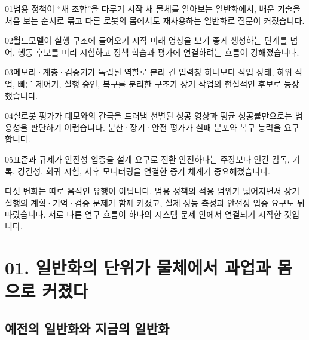 \documentclass[11pt,openany]{book}
\begin{document}
\begin{pivotcard}{01}{범용 정책이 ``새 조합''을 다루기 시작}
새 물체를 알아보는 일반화에서, 배운 기술을 처음 보는 순서로 묶고 다른 로봇의 몸에서도 재사용하는 일반화로 질문이 커졌습니다.
\end{pivotcard}

\begin{pivotcard}{02}{월드모델이 실행 구조에 들어오기 시작}
미래 영상을 보기 좋게 생성하는 단계를 넘어, 행동 후보를 미리 시험하고 정책 학습과 평가에 연결하려는 흐름이 강해졌습니다.
\end{pivotcard}

\begin{pivotcard}{03}{메모리·계층·검증기가 독립된 역할로 분리}
긴 입력창 하나보다 작업 상태, 하위 작업, 빠른 제어기, 실행 승인, 복구를 분리한 구조가 장기 작업의 현실적인 후보로 등장했습니다.
\end{pivotcard}

\begin{pivotcard}{04}{실로봇 평가가 데모와의 간극을 드러냄}
선별된 성공 영상과 평균 성공률만으로는 범용성을 판단하기 어렵습니다. 분산·장기·안전 평가가 실패 분포와 복구 능력을 요구합니다.
\end{pivotcard}

\begin{pivotcard}{05}{표준과 규제가 안전성 입증을 설계 요구로 전환}
안전하다는 주장보다 인간 감독, 기록, 강건성, 회귀 시험, 사후 모니터링을 연결한 증거 체계가 중요해졌습니다.
\end{pivotcard}

\begin{profbox}[서로 연결된 다섯 변화]
다섯 변화는 따로 움직인 유행이 아닙니다. 범용 정책의 적용 범위가 넓어지면서 장기 실행의 계획·기억·검증 문제가 함께 커졌고, 실제 성능 측정과 안전성 입증 요구도 뒤따랐습니다. 서로 다른 연구 흐름이 하나의 시스템 문제 안에서 연결되기 시작한 것입니다.
\end{profbox}

\section*{01. 일반화의 단위가 물체에서 과업과 몸으로 커졌다}

\subsection*{예전의 일반화와 지금의 일반화}
\end{document}

